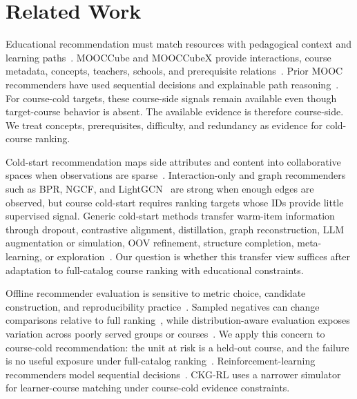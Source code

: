 \documentclass[letterpaper]{article}
\begin{document}
\section{Related Work}
Educational recommendation must match resources with pedagogical context and learning paths~\cite{dasilva2023educationalrs,rahayu2023learningpath}. MOOCCube and MOOCCubeX provide interactions, course metadata, concepts, teachers, schools, and prerequisite relations~\cite{yu2020mooccube,wang2021mooccubex}. Prior MOOC recommenders have used sequential decisions and explainable path reasoning~\cite{zhang2019hrlcourse,dessi2024findingpaths}. For course-cold targets, these course-side signals remain available even though target-course behavior is absent. The available evidence is therefore course-side. We treat concepts, prerequisites, difficulty, and redundancy as evidence for cold-course ranking.

Cold-start recommendation maps side attributes and content into collaborative spaces when observations are sparse~\cite{schein2002coldstart,gantner2010attribute,liu2024once,wu2024llmrec,zhang2025coldstartllm}. Interaction-only and graph recommenders such as BPR, NGCF, and LightGCN~\cite{rendle2009bpr,wang2019ngcf,he2020lightgcn} are strong when enough edges are observed, but course cold-start requires ranking targets whose IDs provide little supervised signal. Generic cold-start methods transfer warm-item information through dropout, contrastive alignment, distillation, graph reconstruction, LLM augmentation or simulation, OOV refinement, structure completion, meta-learning, or exploration~\cite{volkovs2017dropoutnet,zhou2023ccfcrec,huang2023aldi,kim2024cgrc,wang2024llmaugmenter,huang2025coldllm,zhao2024usim,zhao2025fsgnn,luo2025pam,jiang2025itemcentric}. Our question is whether this transfer view suffices after adaptation to full-catalog course ranking with educational constraints.

Offline recommender evaluation is sensitive to metric choice, candidate construction, and reproducibility practice~\cite{sun2020rigorous,hidasi2023flaws,bauer2024landscape}. Sampled negatives can change comparisons relative to full ranking~\cite{krichene2020sampled,li2024itemsampling}, while distribution-aware evaluation exposes variation across poorly served groups or courses~\cite{ekstrand2024distributional}. We apply this concern to course-cold recommendation: the unit at risk is a held-out course, and the failure is no useful exposure under full-catalog ranking~\cite{takehi2025diversification}. Reinforcement-learning recommenders model sequential decisions~\cite{shani2005mdp,zhao2018deepreinforcement,chen2023rlrecsurvey}. CKG-RL uses a narrower simulator for learner-course matching under course-cold evidence constraints.
\end{document}
